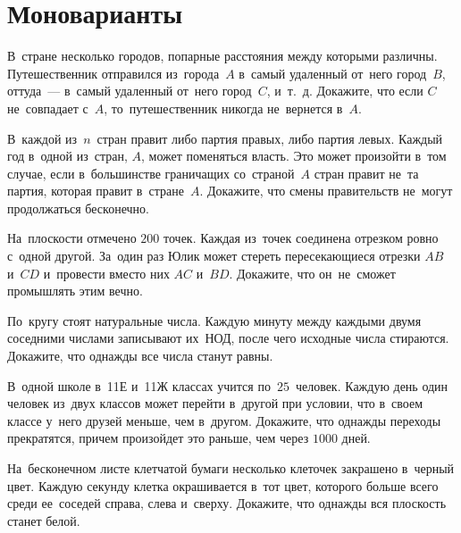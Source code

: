 
\section*{Моноварианты}


\begin{problems}

\item
В~стране несколько городов, попарные расстояния между которыми различны.
Путешественник отправился из~города~$A$ в~самый удаленный от~него город~$B$,
оттуда~--- в~самый удаленный от~него город~$C$, и~т.~д.
Докажите, что если $C$ не~совпадает с~$A$, то~путешественник никогда не~вернется
в~$A$.

\item
В~каждой из~$n$~стран правит либо партия правых, либо партия левых.
Каждый год в~одной из~стран, $A$, может поменяться власть.
Это может произойти в~том случае, если в~большинстве граничащих со~страной~$A$
стран правит не~та партия, которая правит в~стране~$A$.
Докажите, что смены правительств не~могут продолжаться бесконечно.

\item
На~плоскости отмечено $200$ точек.
Каждая из~точек соединена отрезком ровно с~одной другой.
За~один раз Юлик может стереть пересекающиеся отрезки $AB$ и~$CD$ и~провести
вместо них $AC$ и~$BD$.
Докажите, что он~не~сможет промышлять этим вечно.

\item
По~кругу стоят натуральные числа.
Каждую минуту между каждыми двумя соседними числами записывают их~НОД, после
чего исходные числа стираются.
Докажите, что однажды все числа станут равны.

\item
В~одной школе в~11Е и~11Ж классах учится по~$25$~человек.
Каждую день один человек из~двух классов может перейти в~другой при условии,
что в~своем классе у~него друзей меньше, чем в~другом.
Докажите, что однажды переходы прекратятся, причем произойдет это раньше, чем
через $1000$ дней.

\item
На~бесконечном листе клетчатой бумаги несколько клеточек закрашено в~черный
цвет.
Каждую секунду клетка окрашивается в~тот цвет, которого больше всего среди
ее~соседей справа, слева и~сверху.
Докажите, что однажды вся плоскость станет белой.


\end{problems}
